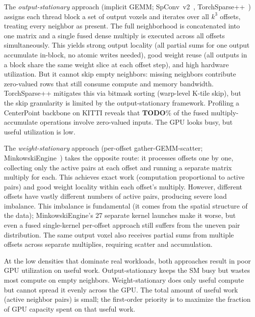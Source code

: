 The \emph{output-stationary} approach (implicit GEMM; SpConv~v2~\cite{spconv2},
TorchSparse++~\cite{torchsparse++}) assigns each thread block a set of
output voxels and iterates over all $k^3$ offsets, treating every neighbor
as present.
The full neighborhood is concatenated into one matrix and a single fused
dense multiply is executed across all offsets simultaneously.
This yields strong output locality (all partial sums for one output
accumulate in-block, no atomic writes needed), good weight reuse (all
outputs in a block share the same weight slice at each offset step), and
high hardware utilization.
But it cannot skip empty neighbors: missing neighbors contribute
zero-valued rows that still consume compute and memory bandwidth.
TorchSparse++ mitigates this via bitmask sorting (warp-level K-tile skip),
but the skip granularity is limited by the output-stationary framework.
Profiling a CenterPoint backbone on KITTI reveals that \textbf{TODO}\%
of the fused multiply-accumulate operations involve zero-valued inputs.
The GPU looks busy, but useful utilization is low.

The \emph{weight-stationary} approach (per-offset gather-GEMM-scatter;
MinkowskiEngine~\cite{minkowski}) takes the opposite route: it processes
offsets one by one, collecting only the active pairs at each offset and
running a separate matrix multiply for each.
This achieves exact work (computation proportional to active pairs) and
good weight locality within each offset's multiply.
However, different offsets have vastly different numbers of active pairs,
producing severe load imbalance.
This imbalance is fundamental (it comes from the spatial structure of the
data); MinkowskiEngine's 27 separate kernel launches make it worse, but
even a fused single-kernel per-offset approach still suffers from the
uneven pair distribution.
The same output voxel also receives partial sums from multiple offsets
across separate multiplies, requiring scatter and accumulation.

At the low densities that dominate real workloads, both approaches result
in poor GPU utilization on useful work.
Output-stationary keeps the SM busy but wastes most compute on empty
neighbors.
Weight-stationary does only useful compute but cannot spread it evenly
across the GPU.
The total amount of useful work (active neighbor pairs) is small; the
first-order priority is to maximize the fraction of GPU capacity spent on
that useful work.

